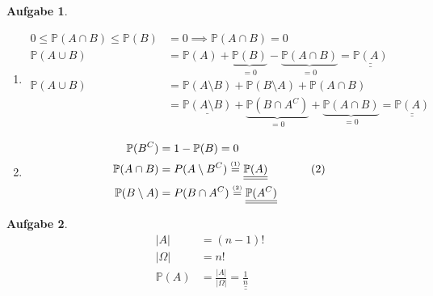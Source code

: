 \documentclass[11pt]{article}
\theoremstyle{break}
\newtheorem{task}{Aufgabe}
\begin{document}
\setcounter{task}{2}
\begin{task}
\hfill\vspace{-5mm}
\begin{enumerate}[label={(\alph*)}]
\item \hfill\vspace{-8mm}
\begin{align*}
0\leq \mathbb{P}(A\cap B) \leq \mathbb{P}(B) &= 0 \implies \mathbb{P}(A\cap B) = 0&\\
\mathbb{P}(A\cup B) &= \mathbb{P}(A) + \underbrace{\mathbb{P}(B)}_{=0} - \underbrace{\mathbb{P}(A\cap B)}_{=0} = \underline{\underline{\mathbb{P}(A)}}&\\
\mathbb{P}(A\cup B) &= \mathbb{P}(A\setminus B) + \mathbb{P}(B\setminus A) + \mathbb{P}(A\cap B)&\\
&= \underline{\mathbb{P}(A\setminus B)} + \underbrace{\mathbb{P}(B\cap A^C)}_{=0} + \underbrace{\mathbb{P}(A\cap B)}_{=0} = \underline{\underline{\mathbb{P}(A)}}&\tag{1}
\end{align*}
\item \hfill\vspace{-8mm}
\begin{align*}
    \mathbb{P}(B^C)&=1-\mathbb{P}(B)=0&\\
    \mathbb{P}(A\cap B)&=P(A\setminus B^C) \stackrel{\mbox{\tiny (1)}}{=} \underline{\underline{\mathbb{P}(A)}}&\tag{2}\\
    \mathbb{P}(B\setminus A)&=P(B\cap A^C) \stackrel{\mbox{\tiny (2)}}{=} \underline{\underline{\mathbb{P}(A^C)}}
\end{align*}
\end{enumerate}
\end{task}

\setcounter{task}{4}
\begin{task}
     \hfill\vspace{-8mm}
    \begin{align*}
        \left\vert A \right\vert &= (n-1)! \\
        \left\vert \Omega \right\vert &= n! \\
        \mathbb{P}(A) &= \frac{\left\vert A \right\vert}{\left\vert \Omega \right\vert} = \underline{\underline{\frac{1}{n}}} 
    \end{align*}
\end{task}
\end{document}
